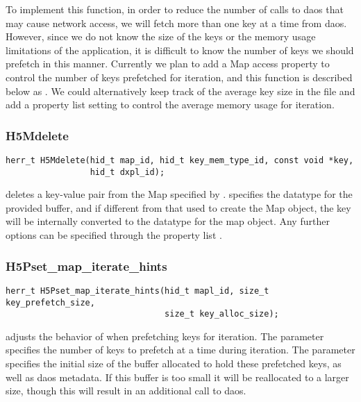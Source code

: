 \documentclass[../design_doc.tex]{subfiles}
\begin{document}
To implement this function, in order to reduce the number of calls to \acrshort{daos} that may cause network access, we will fetch more than one key at a time from \acrshort{daos}. However, since we do not know the size of the keys or the memory usage limitations of the application, it is difficult to know the number of keys we should prefetch in this manner. Currently we plan to add a Map access property to control the number of keys prefetched for iteration, and this function is described below as . We could alternatively keep track of the average key size in the file and add a property list setting to control the average memory usage for iteration.

\subsubsection{H5Mdelete}

\begin{verbatim}
herr_t H5Mdelete(hid_t map_id, hid_t key_mem_type_id, const void *key,
                 hid_t dxpl_id);
\end{verbatim}

 deletes a key-value pair from the Map specified by .  specifies the datatype for the provided  buffer, and if different from that used to create the Map object, the key will be internally converted to the datatype for the map object. Any further options can be specified through the property list .

\subsubsection{H5Pset\_map\_iterate\_hints}

\begin{verbatim}
herr_t H5Pset_map_iterate_hints(hid_t mapl_id, size_t key_prefetch_size,
                                size_t key_alloc_size);
\end{verbatim}

 adjusts the behavior of  when prefetching keys for iteration. The  parameter specifies the number of keys to prefetch at a time during iteration. The  parameter specifies the initial size of the buffer allocated to hold these prefetched keys, as well as \acrshort{daos} metadata. If this buffer is too small it will be reallocated to a larger size, though this will result in an additional call to \acrshort{daos}.
\end{document}
